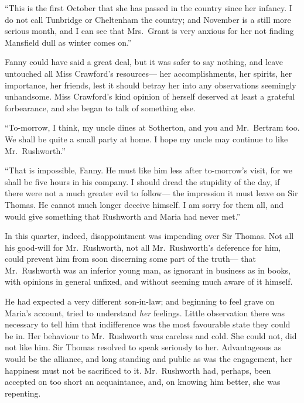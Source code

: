 \documentclass{article}
\begin{document}
``This is the first October that she has passed in the country
since her infancy.  I do not call Tunbridge or Cheltenham
the country; and November is a still more serious month,
and I can see that Mrs.\ Grant is very anxious for her
not finding Mansfield dull as winter comes on.''

Fanny could have said a great deal, but it was safer to
say nothing, and leave untouched all Miss Crawford's resources---%
her accomplishments, her spirits, her importance,
her friends, lest it should betray her into any observations
seemingly unhandsome.  Miss Crawford's kind opinion
of herself deserved at least a grateful forbearance,
and she began to talk of something else.

``To-morrow, I think, my uncle dines at Sotherton, and you
and Mr.\ Bertram too.  We shall be quite a small party at home.
I hope my uncle may continue to like Mr.\ Rushworth.''

``That is impossible, Fanny.  He must like him less
after to-morrow's visit, for we shall be five hours
in his company.  I should dread the stupidity of the day,
if there were not a much greater evil to follow---%
the impression it must leave on Sir Thomas.  He cannot much
longer deceive himself.  I am sorry for them all, and would
give something that Rushworth and Maria had never met.''

In this quarter, indeed, disappointment was impending
over Sir Thomas.  Not all his good-will for Mr.\ Rushworth,
not all Mr.\ Rushworth's deference for him, could prevent
him from soon discerning some part of the truth---%
that Mr.\ Rushworth was an inferior young man, as ignorant
in business as in books, with opinions in general unfixed,
and without seeming much aware of it himself.

He had expected a very different son-in-law; and beginning
to feel grave on Maria's account, tried to understand
\emph{her} feelings.  Little observation there was necessary
to tell him that indifference was the most favourable
state they could be in.  Her behaviour to Mr.\ Rushworth
was careless and cold.  She could not, did not like him.
Sir Thomas resolved to speak seriously to her.
Advantageous as would be the alliance, and long standing
and public as was the engagement, her happiness must not be
sacrificed to it.  Mr.\ Rushworth had, perhaps, been accepted
on too short an acquaintance, and, on knowing him better,
she was repenting.
\end{document}
